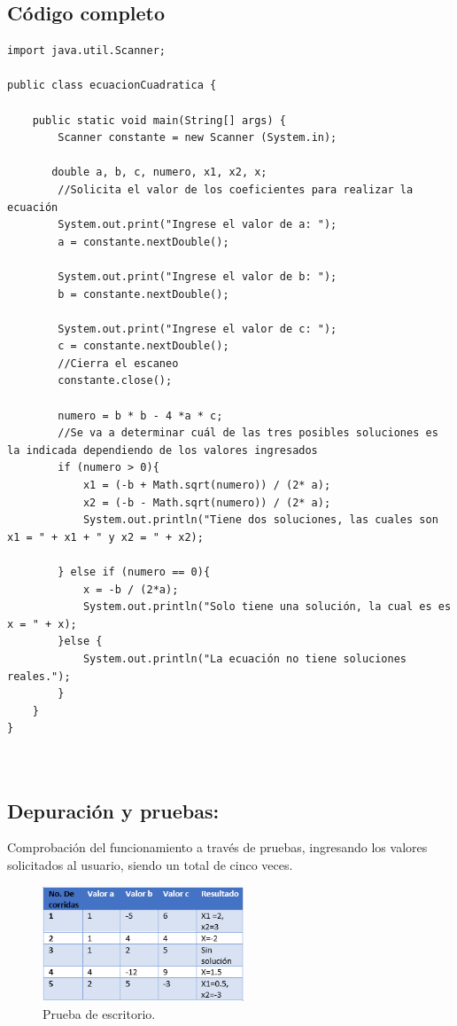\subsection{Código completo}
\begin{lstlisting}[style=javaStyle]
import java.util.Scanner;

public class ecuacionCuadratica {

    public static void main(String[] args) {
        Scanner constante = new Scanner (System.in); 
        
       double a, b, c, numero, x1, x2, x;
        //Solicita el valor de los coeficientes para realizar la ecuación
        System.out.print("Ingrese el valor de a: ");
        a = constante.nextDouble();
        
        System.out.print("Ingrese el valor de b: ");
        b = constante.nextDouble();
        
        System.out.print("Ingrese el valor de c: ");
        c = constante.nextDouble();
        //Cierra el escaneo
        constante.close();
        
        numero = b * b - 4 *a * c;
        //Se va a determinar cuál de las tres posibles soluciones es la indicada dependiendo de los valores ingresados
        if (numero > 0){
            x1 = (-b + Math.sqrt(numero)) / (2* a);
            x2 = (-b - Math.sqrt(numero)) / (2* a);
            System.out.println("Tiene dos soluciones, las cuales son x1 = " + x1 + " y x2 = " + x2);
            
        } else if (numero == 0){
            x = -b / (2*a);
            System.out.println("Solo tiene una solución, la cual es es x = " + x);
        }else {
            System.out.println("La ecuación no tiene soluciones reales.");
        }
    }
}



\end{lstlisting}
\subsection{\textbf{Depuración y pruebas:}}
Comprobación del funcionamiento a través de pruebas, ingresando los valores solicitados al usuario, siendo un total de cinco veces.
\begin{figure}[!ht]
\centering
\includegraphics[width=6cm]{LaTeX/latex-imagenes/tablaprueba.png}
\caption{Prueba de escritorio.}
\label{fig:diagrama_flujo}
\end{figure}